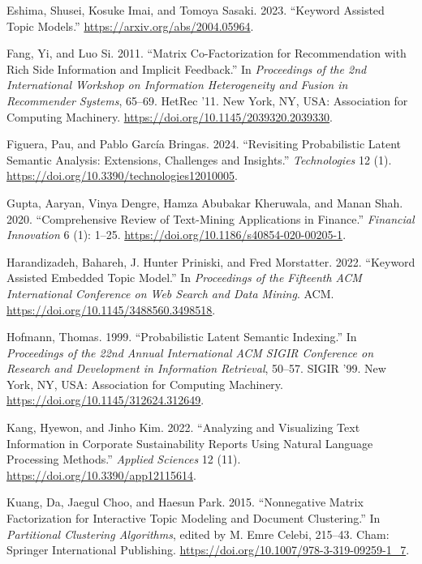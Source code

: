 \documentclass[
]{article}
\newlength{\cslhangindent}
\newlength{\cslentryspacingunit} %
\newenvironment{CSLReferences}[2] %
 {%
  \setlength{\parindent}{0pt}
  \ifodd #1
  \let\oldpar\par
  \def\par{\hangindent=\cslhangindent\oldpar}
  \fi
  \setlength{\parskip}{#2\cslentryspacingunit}
 }%
 {}
\begin{document}
\begin{CSLReferences}{1}{0}
\leavevmode{}%
Eshima, Shusei, Kosuke Imai, and Tomoya Sasaki. 2023. {``Keyword Assisted Topic Models.''} \url{https://arxiv.org/abs/2004.05964}.

\leavevmode{}%
Fang, Yi, and Luo Si. 2011. {``Matrix Co-Factorization for Recommendation with Rich Side Information and Implicit Feedback.''} In \emph{Proceedings of the 2nd International Workshop on Information Heterogeneity and Fusion in Recommender Systems}, 65--69. HetRec '11. New York, NY, USA: Association for Computing Machinery. \url{https://doi.org/10.1145/2039320.2039330}.

\leavevmode{}%
Figuera, Pau, and Pablo García Bringas. 2024. {``Revisiting Probabilistic Latent Semantic Analysis: Extensions, Challenges and Insights.''} \emph{Technologies} 12 (1). \url{https://doi.org/10.3390/technologies12010005}.

\leavevmode{}%
Gupta, Aaryan, Vinya Dengre, Hamza Abubakar Kheruwala, and Manan Shah. 2020. {``Comprehensive Review of Text-Mining Applications in Finance.''} \emph{Financial Innovation} 6 (1): 1--25. \url{https://doi.org/10.1186/s40854-020-00205-1}.

\leavevmode{}%
Harandizadeh, Bahareh, J. Hunter Priniski, and Fred Morstatter. 2022. {``Keyword Assisted Embedded Topic Model.''} In \emph{Proceedings of the Fifteenth {ACM} International Conference on Web Search and Data Mining}. {ACM}. \url{https://doi.org/10.1145/3488560.3498518}.

\leavevmode{}%
Hofmann, Thomas. 1999. {``Probabilistic Latent Semantic Indexing.''} In \emph{Proceedings of the 22nd Annual International ACM SIGIR Conference on Research and Development in Information Retrieval}, 50--57. SIGIR '99. New York, NY, USA: Association for Computing Machinery. \url{https://doi.org/10.1145/312624.312649}.

\leavevmode{}%
Kang, Hyewon, and Jinho Kim. 2022. {``Analyzing and Visualizing Text Information in Corporate Sustainability Reports Using Natural Language Processing Methods.''} \emph{Applied Sciences} 12 (11). \url{https://doi.org/10.3390/app12115614}.

\leavevmode{}%
Kuang, Da, Jaegul Choo, and Haesun Park. 2015. {``Nonnegative Matrix Factorization for Interactive Topic Modeling and Document Clustering.''} In \emph{Partitional Clustering Algorithms}, edited by M. Emre Celebi, 215--43. Cham: Springer International Publishing. \url{https://doi.org/10.1007/978-3-319-09259-1_7}.


\end{CSLReferences}
\end{document}
